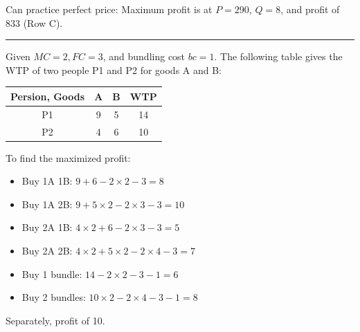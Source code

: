 \documentclass[a4paper]{article}
\begin{document}
\begin{multicols*}{3}
    Can practice perfect price: Maximum profit is at $P=290$, $Q=8$, and profit of $833$ (Row C).


    \rule{1\linewidth}{0.4pt}

    Given $MC=2, FC=3$, and bundling cost $bc=1$. The following table gives the WTP of two people P1 and P2 for goods A and B:

    \begin{tabular}{|c|c|c|c|}
        \hline
        Persion, Goods & A & B & WTP \\
        \hline
        P1             & 9 & 5 & 14  \\
        P2             & 4 & 6 & 10  \\
        \hline
    \end{tabular}

    To find the maximized profit:
    \begin{itemize}
        \item Buy 1A 1B: $9 + 6 - 2\times2 - 3 = 8$
        \item Buy 1A 2B: $9 + 5\times2 - 2\times3 - 3 = 10$
        \item Buy 2A 1B: $4\times2 + 6 - 2\times3 - 3 = 5$
        \item Buy 2A 2B: $4\times2 + 5\times2 - 2\times4 - 3 = 7$
        \item Buy 1 bundle: $14 - 2\times2 - 3 - 1 = 6$
        \item Buy 2 bundles: $10\times2 - 2\times4 - 3 - 1 = 8$
    \end{itemize}
    Separately, profit of 10.

\end{multicols*}
\end{document}
